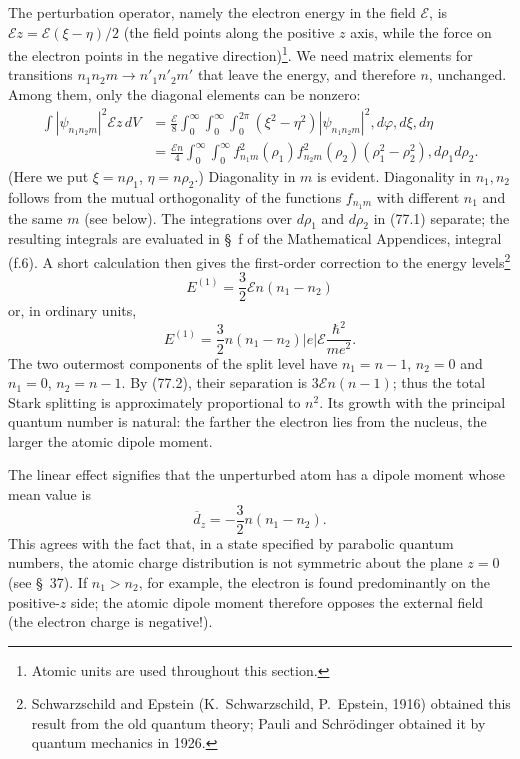 The perturbation operator, namely the electron energy in the field $\mathcal E$, is $\mathcal Ez=\mathcal E(\xi-\eta)/2$ (the field points along the positive $z$ axis, while the force on the electron points in the negative direction)\footnote{Atomic units are used throughout this section.}. We need matrix elements for transitions $n_1n_2m\to n'_1n'_2m'$ that leave the energy, and therefore $n$, unchanged. Among them, only the diagonal elements can be nonzero:
\begin{equation}
\begin{split}
 \int|\psi_{n_1n_2m}|^2\mathcal Ez\,dV
 &=\frac{\mathcal E}{8}\int_0^\infty\!\int_0^\infty\!\int_0^{2\pi}(\xi^2-\eta^2)|\psi_{n_1n_2m}|^2,d\varphi,d\xi,d\eta\\
 &=\frac{\mathcal En}{4}\int_0^\infty\!\int_0^\infty f_{n_1m}^2(\rho_1)f_{n_2m}^2(\rho_2)(\rho_1^2-\rho_2^2),d\rho_1d\rho_2.
\end{split}
\tag{77.1}
\end{equation}
(Here we put $\xi=n\rho_1$, $\eta=n\rho_2$.) Diagonality in $m$ is evident. Diagonality in $n_1,n_2$ follows from the mutual orthogonality of the functions $f_{n_1m}$ with different $n_1$ and the same $m$ (see below). The integrations over $d\rho_1$ and $d\rho_2$ in (77.1) separate; the resulting integrals are evaluated in \S~f of the Mathematical Appendices, integral (f.6). A short calculation then gives the first-order correction to the energy levels\footnote{Schwarzschild and Epstein (K.~Schwarzschild, P.~Epstein, 1916) obtained this result from the old quantum theory; Pauli and Schrödinger obtained it by quantum mechanics in 1926.}
\begin{equation}
 E^{(1)}=\frac32\mathcal En(n_1-n_2)
 \tag{77.2}
\end{equation}
or, in ordinary units,
\[
 E^{(1)}=\frac32n(n_1-n_2)|e|\mathcal E\frac{\hbar^2}{me^2}.
\]
The two outermost components of the split level have $n_1=n-1$, $n_2=0$ and $n_1=0$, $n_2=n-1$. By (77.2), their separation is $3\mathcal En(n-1)$; thus the total Stark splitting is approximately proportional to $n^2$. Its growth with the principal quantum number is natural: the farther the electron lies from the nucleus, the larger the atomic dipole moment.

The linear effect signifies that the unperturbed atom has a dipole moment whose mean value is
\begin{equation}
 \overline d_z=-\frac32n(n_1-n_2).
 \tag{77.3}
\end{equation}
This agrees with the fact that, in a state specified by parabolic quantum numbers, the atomic charge distribution is not symmetric about the plane $z=0$ (see \S~37). If $n_1>n_2$, for example, the electron is found predominantly on the positive-$z$ side; the atomic dipole moment therefore opposes the external field (the electron charge is negative!).

